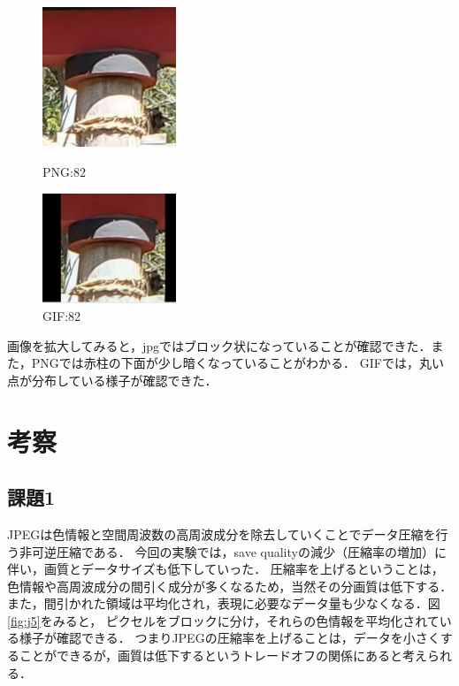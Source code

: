 \documentclass[a4paper,11pt]{bxjsarticle}
\begin{document}
     \begin{figure}[htbp]
      \begin{minipage}{0.5\hsize}
       \begin{center}
        \includegraphics[width=40mm]{sample_p82_tri.png}
       \end{center}
       \caption{PNG:82}
       \label{fig:p82}
      \end{minipage}
      \begin{minipage}{0.5\hsize}
       \begin{center}
        \includegraphics[width=40mm]{sample_g82_tri.jpg}
       \end{center}
       \caption{GIF:82}
       \label{fig:g82}
      \end{minipage}
     \end{figure}

  画像を拡大してみると，jpgではブロック状になっていることが確認できた．また，PNGでは赤柱の下面が少し暗くなっていることがわかる．
  GIFでは，丸い点が分布している様子が確認できた．


\section{考察}
\subsection{課題1}
JPEGは色情報と空間周波数の高周波成分を除去していくことでデータ圧縮を行う非可逆圧縮である．
今回の実験では，save qualityの減少（圧縮率の増加）に伴い，画質とデータサイズも低下していった．
圧縮率を上げるということは，色情報や高周波成分の間引く成分が多くなるため，当然その分画質は低下する．
また，間引かれた領域は平均化され，表現に必要なデータ量も少なくなる．図\ref{fig:j5}をみると，
ピクセルをブロックに分け，それらの色情報を平均化されている様子が確認できる．
つまりJPEGの圧縮率を上げることは，データを小さくすることができるが，画質は低下するというトレードオフの関係にあると考えられる．\\
\\
\end{document}

